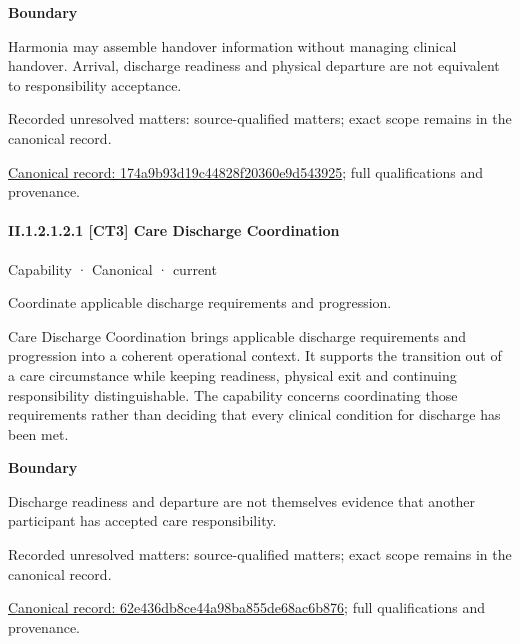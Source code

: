 \textbf{Boundary}



Harmonia may assemble handover information without managing clinical handover. Arrival, discharge readiness and physical departure are not equivalent to responsibility acceptance.


{\small Recorded unresolved matters: source-qualified matters; exact scope remains in the canonical record.}\par
{\footnotesize \href{../../../../../../../continuum/strategy/capability/174a9b93d19c44828f20360e9d543925.md}{Canonical record: 174a9b93d19c44828f20360e9d543925}; full qualifications and provenance.}\par
\paragraph*{II.1.2.1.2.1 [CT3] Care Discharge Coordination}
\label{navigation:II.1.2.1.2.1}

\label{element:62e436db8ce44a98ba855de68ac6b876}
{\small Capability · Canonical · current}\par

Coordinate applicable discharge requirements and progression.



Care Discharge Coordination brings applicable discharge requirements and progression into a coherent operational context. It supports the transition out of a care circumstance while keeping readiness, physical exit and continuing responsibility distinguishable. The capability concerns coordinating those requirements rather than deciding that every clinical condition for discharge has been met.



\textbf{Boundary}



Discharge readiness and departure are not themselves evidence that another participant has accepted care responsibility.


{\small Recorded unresolved matters: source-qualified matters; exact scope remains in the canonical record.}\par
{\footnotesize \href{../../../../../../../continuum/strategy/capability/62e436db8ce44a98ba855de68ac6b876.md}{Canonical record: 62e436db8ce44a98ba855de68ac6b876}; full qualifications and provenance.}\par

